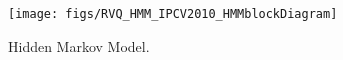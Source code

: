 \documentclass{article}
\begin{document}
%
%
			\begin{figure}				
					\texttt{[image: figs/RVQ\_HMM\_IPCV2010\_HMMblockDiagram]}
					\centering
					\caption{Hidden Markov Model.}
					\label{fig:HMM}
			\end{figure}
			
\end{document}
